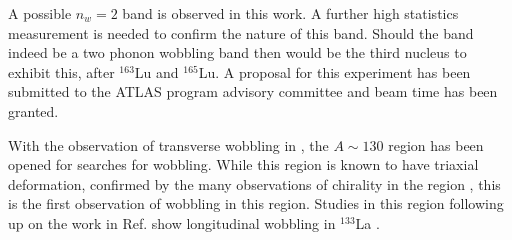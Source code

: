 A possible $n_w=2$ band is observed in this work. A further high statistics measurement is needed to confirm the nature of this band. Should the band indeed be a two phonon wobbling band then \pr{} would be the third nucleus to exhibit this, after $^{163}$Lu and $^{165}$Lu. A proposal for this experiment has been submitted to the ATLAS program advisory committee and beam time has been granted.

With the observation of transverse wobbling in \pr{}, the $A\sim{}130$ region has been opened for searches for wobbling. While this region is known to have triaxial deformation, confirmed by the many observations of chirality in the region \cite{chiralityIn134Pr,chiralityA130Region,chiralityUpperA130Region,chiralityA130Region2,chirality136Pm,chiralityMore135Nd,chiralityIn135Nd,chiralityMulti133Cs}, this is the first observation of wobbling in this region. Studies in this region following up on the work in Ref. \cite{mattaTransversePRL} show longitudinal wobbling in $^{133}$La \cite{palitLongWobbling}.

